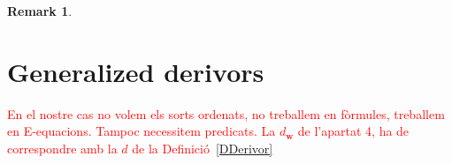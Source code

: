\documentclass{amsart}
\newcommand{\mor}{\usebox{\xymor}}    %
\theoremstyle{plain}
\newtheorem{remark}[theorem]{Remark}
\theoremstyle{definition}
\begin{document}
\begin{remark}
\end{remark}

\section{Generalized derivors}
\textcolor{red}{En el nostre cas no volem els sorts ordenats, no treballem en fòrmules, treballem en E-equacions. Tampoc necessitem predicats. La $d_{\mathbf{w}}$ de l'apartat 4, ha de correspondre amb la $d$ de la Definició~\ref{DDerivor}}
\end{document}
